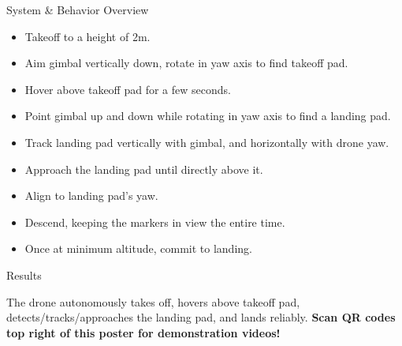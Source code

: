 \documentclass[final, 20pt]{beamer}
\newlength{\colwidth}
\begin{document}
\begin{frame}[t]
\begin{columns}[t]
\begin{column}{\colwidth}
\begin{alertblock}{System \& Behavior Overview}
    \begin{itemize}
      \item Takeoff to a height of 2m.
      \item Aim gimbal vertically down, rotate in yaw axis to find takeoff pad.
      \item Hover above takeoff pad for a few seconds.
      \item Point gimbal up and down while rotating in yaw axis to find a landing pad.
      \item Track landing pad vertically with gimbal, and horizontally with drone yaw.
      \item Approach the landing pad until directly above it.
      \item Align to landing pad's yaw.
      \item Descend, keeping the markers in view the entire time.
      \item Once at minimum altitude, commit to landing.
    \end{itemize}
  \end{alertblock}

  \begin{block}{Results}

    The drone autonomously takes off, hovers above takeoff pad, detects/tracks/approaches the landing pad, and lands reliably.
    \textbf{Scan QR codes top right of this poster for demonstration videos!}


\end{block}
\end{column}
\end{columns}
\end{frame}
\end{document}
